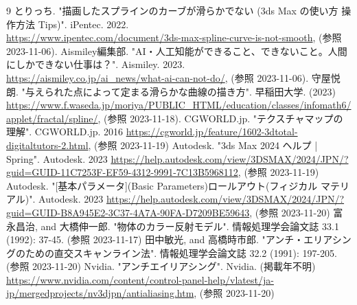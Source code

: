 \documentclass[a4j]{jarticle}
\begin{document}
\newpage
\begin{thebibliography}{9}
    とりっち. "描画したスプラインのカーブが滑らかでない (3ds Max の使い方 操作方法 Tips)". iPentec. 2022. \\
    \url{https://www.ipentec.com/document/3ds-max-spline-curve-is-not-smooth}, (参照 2023-11-06).
    Aismiley編集部. "AI・人工知能ができること、できないこと。人間にしかできない仕事は？". Aismiley. 2023. \\
    \url{https://aismiley.co.jp/ai_news/what-ai-can-not-do/}, (参照 2023-11-06).
    守屋悦朗. "与えられた点によって定まる滑らかな曲線の描き方". 早稲田大学. (2023)\\ 
\url{https://www.f.waseda.jp/moriya/PUBLIC_HTML/education/classes/infomath6/applet/fractal/spline/}, (参照 2023-11-18).
    CGWORLD.jp. "テクスチャマップの理解". CGWORLD.jp. 2016
\url{https://cgworld.jp/feature/1602-3dtotal-digitaltutors-2.html}, (参照 2023-11-19)
    Autodesk. "3ds Max 2024 ヘルプ | Spring". Autodesk. 2023
\url{https://help.autodesk.com/view/3DSMAX/2024/JPN/?guid=GUID-11C7253F-EF59-4312-9991-7C13B5968112}, (参照 2023-11-19)
    Autodesk. "[基本パラメータ](Basic Parameters)ロールアウト(フィジカル マテリアル)". Autodesk. 2023
\url{https://help.autodesk.com/view/3DSMAX/2024/JPN/?guid=GUID-B8A945E2-3C37-4A7A-90FA-D7209BE59643}, (参照 2023-11-20)
    富永昌治, and 大橋伸一郎. "物体のカラー反射モデル". 情報処理学会論文誌 33.1 (1992): 37-45. (参照 2023-11-17)
    田中敏光, and 高橋時市郎. "アンチ・エリアシングのための直交スキャンライン法". 情報処理学会論文誌 32.2 (1991): 197-205. (参照 2023-11-20)
    Nvidia. "アンチエイリアシング". Nvidia. (掲載年不明)
\url{https://www.nvidia.com/content/control-panel-help/vlatest/ja-jp/mergedprojects/nv3djpn/antialiasing.htm}, (参照 2023-11-20)
\end{thebibliography}
\end{document}
